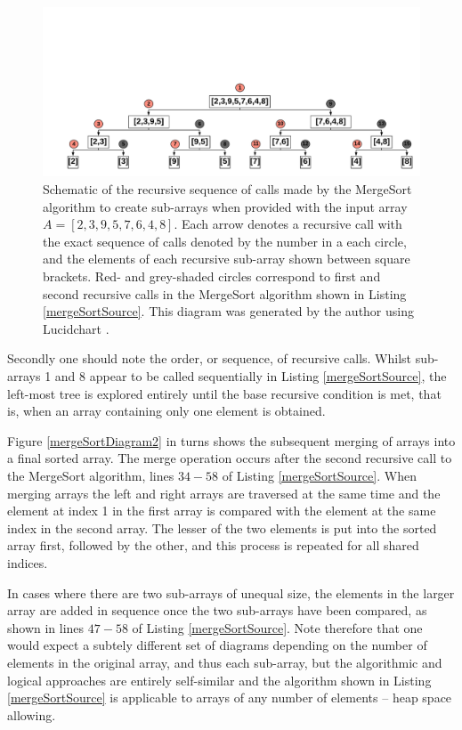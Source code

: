 \documentclass[12pt,a4paper]{article}
\begin{document}
\begin{figure}[t!]
\includegraphics[scale=0.45]{mergesort_recursion.png} 
\caption{Schematic of the recursive sequence of calls made by the MergeSort algorithm to create sub-arrays when provided with the input array $A = [2,3,9,5,7,6,4,8]$. Each arrow denotes a recursive call with the exact sequence of calls denoted by the number in a each circle, and the elements of each recursive sub-array shown between square brackets. Red- and grey-shaded circles correspond to first and second recursive calls in the MergeSort algorithm shown in Listing \ref{mergeSortSource}. This diagram was generated by the author using Lucidchart \cite{lucidchart}.}
\label{mergeSortDiagram1}
\end{figure}



Secondly one should note the order, or sequence, of recursive calls. Whilst sub-arrays 1 and 8 appear to be called sequentially in Listing \ref{mergeSortSource}, the left-most tree is explored entirely until the base recursive condition is met, that is, when an array containing only one element is obtained. 

Figure \ref{mergeSortDiagram2} in turns shows the subsequent merging of arrays into a final sorted array. The merge operation occurs after the second recursive call to the MergeSort algorithm, lines $34-58$ of Listing \ref{mergeSortSource}. When merging arrays the left and right arrays are traversed at the same time and the element at index 1 in the first array is compared with the element at the same index in the second array. The lesser of the two elements is put into the sorted array first, followed by the other, and this process is repeated for all shared indices. 

In cases where there are two sub-arrays of unequal size, the elements in the larger array are added in sequence once the two sub-arrays have been compared, as shown in lines $47-58$ of Listing \ref{mergeSortSource}. Note therefore that one would expect a subtely different set of diagrams depending on the number of elements in the original array, and thus each sub-array, but the algorithmic and logical approaches are entirely self-similar and the algorithm shown in Listing \ref{mergeSortSource} is applicable to arrays of any number of elements -- heap space allowing.
\end{document}
